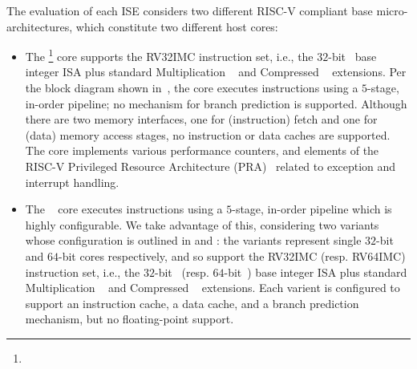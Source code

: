 
The evaluation of each ISE considers two different RISC-V compliant base
micro-architectures, which constitute two different host cores:

\begin{itemize}
\item The \footnote{%
      } core 
      supports the 
      RV32IMC 
      instruction set, i.e.,
      the 
             $32$-bit~\cite[Section 2]{RV:ISA:I:19} 
      base integer ISA plus 
      standard 
      Multiplication ~\cite[Section  7]{RV:ISA:I:19}
      and
      Compressed ~\cite[Section 16]{RV:ISA:I:19}
      extensions.
      Per the block diagram shown in~,
      the core 
      executes instructions using a $5$-stage, in-order pipeline;
      no mechanism for
      branch prediction
      is supported.
      Although there are two memory interfaces, one for (instruction) fetch and one for (data) memory access stages,
      no
      instruction or data caches 
      are supported.
      The core implements various performance counters,
      and
      elements of the
      RISC-V Privileged Resource Architecture (PRA)~\cite[Chapter 3]{RV:ISA:II:17}
      related to exception and interrupt handling.

\item The ~\cite{rocket:16} 
        core
      executes instructions using a $5$-stage, in-order pipeline
      which is highly configurable.
      We take advantage of this, considering two variants whose configuration
      is outlined in
      and 
      :
      the variants represent single $32$-bit and $64$-bit cores respectively,
      and so
      support  the 
      RV32IMC 
      (resp. RV64IMC)
      instruction set, i.e.,
      the 
             $32$-bit~\cite[Section 2]{RV:ISA:I:19} 
      (resp. $64$-bit~\cite[Section 5]{RV:ISA:I:19})
      base integer ISA plus 
      standard 
      Multiplication ~\cite[Section  7]{RV:ISA:I:19}
      and
      Compressed ~\cite[Section 16]{RV:ISA:I:19}
      extensions.
      Each varient is configured to support
      an instruction cache, 
      a  data        cache,
      and
      a  branch prediction mechanism,
      but 
      no floating-point support.

\end{itemize}

